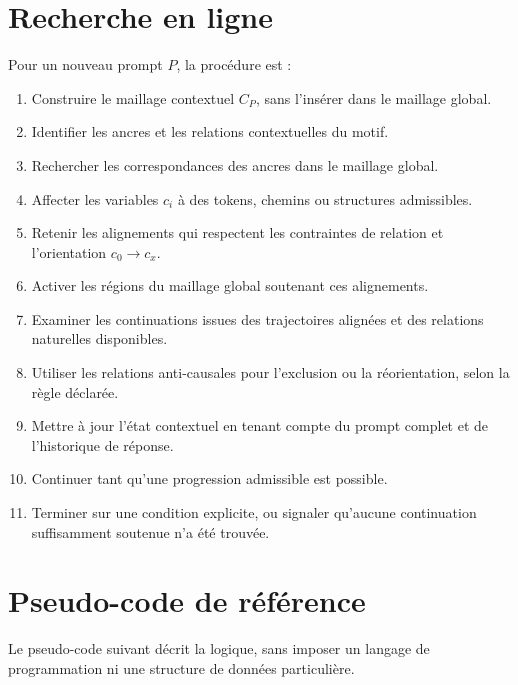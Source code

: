 \documentclass[11pt,a4paper]{report}
\theoremstyle{definition}
\theoremstyle{plain}
\theoremstyle{remark}
\begin{document}
\section{Recherche en ligne}

Pour un nouveau prompt \(P\), la procédure est :

\begin{enumerate}[label=\arabic*.]
  \item Construire le maillage contextuel \(C_P\), sans l'insérer
        dans le maillage global.
  \item Identifier les ancres et les relations contextuelles
        du motif.
  \item Rechercher les correspondances des ancres dans le
        maillage global.
  \item Affecter les variables \(c_i\) à des tokens, chemins ou
        structures admissibles.
  \item Retenir les alignements qui respectent les contraintes
        de relation et l'orientation \(c_0\to c_x\).
  \item Activer les régions du maillage global soutenant ces
        alignements.
  \item Examiner les continuations issues des trajectoires
        alignées et des relations naturelles disponibles.
  \item Utiliser les relations anti-causales pour l'exclusion ou
        la réorientation, selon la règle déclarée.
  \item Mettre à jour l'état contextuel en tenant compte du prompt
        complet et de l'historique de réponse.
  \item Continuer tant qu'une progression admissible est possible.
  \item Terminer sur une condition explicite, ou signaler qu'aucune
        continuation suffisamment soutenue n'a été trouvée.
\end{enumerate}

\section{Pseudo-code de référence}

Le pseudo-code suivant décrit la logique, sans imposer un langage
de programmation ni une structure de données particulière.
\end{document}
